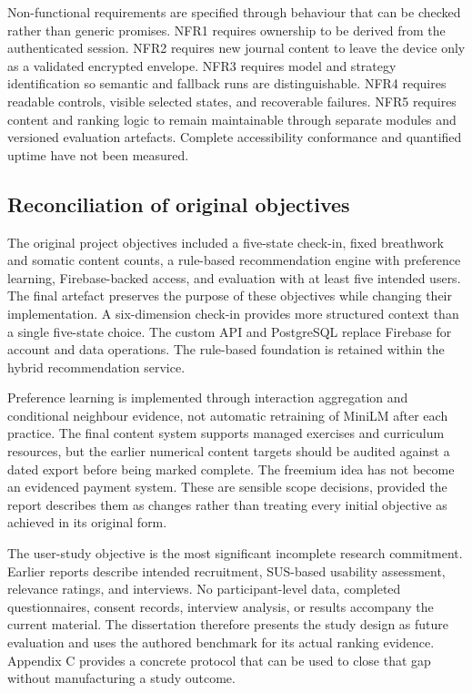 Non-functional requirements are specified through behaviour that can be checked rather than generic promises. NFR1 requires ownership to be derived from the authenticated session. NFR2 requires new journal content to leave the device only as a validated encrypted envelope. NFR3 requires model and strategy identification so semantic and fallback runs are distinguishable. NFR4 requires readable controls, visible selected states, and recoverable failures. NFR5 requires content and ranking logic to remain maintainable through separate modules and versioned evaluation artefacts. Complete accessibility conformance and quantified uptime have not been measured.

\subsection{Reconciliation of original objectives}

The original project objectives included a five-state check-in, fixed breathwork and somatic content counts, a rule-based recommendation engine with preference learning, Firebase-backed access, and evaluation with at least five intended users. The final artefact preserves the purpose of these objectives while changing their implementation. A six-dimension check-in provides more structured context than a single five-state choice. The custom API and PostgreSQL replace Firebase for account and data operations. The rule-based foundation is retained within the hybrid recommendation service.

Preference learning is implemented through interaction aggregation and conditional neighbour evidence, not automatic retraining of MiniLM after each practice. The final content system supports managed exercises and curriculum resources, but the earlier numerical content targets should be audited against a dated export before being marked complete. The freemium idea has not become an evidenced payment system. These are sensible scope decisions, provided the report describes them as changes rather than treating every initial objective as achieved in its original form.

The user-study objective is the most significant incomplete research commitment. Earlier reports describe intended recruitment, SUS-based usability assessment, relevance ratings, and interviews. No participant-level data, completed questionnaires, consent records, interview analysis, or results accompany the current material. The dissertation therefore presents the study design as future evaluation and uses the authored benchmark for its actual ranking evidence. Appendix C provides a concrete protocol that can be used to close that gap without manufacturing a study outcome.

